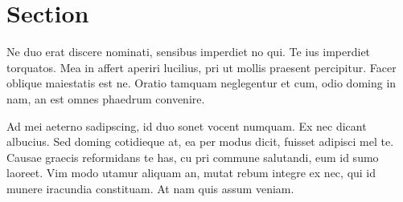 \documentclass[10pt,a4paper,twocolumn,german]{article}
\begin{document}
\section{Section}

	Ne duo erat discere nominati, sensibus imperdiet no qui.
	Te ius imperdiet torquatos.
	Mea in affert aperiri lucilius, pri ut mollis praesent percipitur.
	Facer oblique maiestatis est ne.
	Oratio tamquam neglegentur et cum, odio doming in nam, an est omnes phaedrum convenire.

	Ad mei aeterno sadipscing, id duo sonet vocent numquam.
	Ex nec dicant albucius. Sed doming cotidieque at, ea per modus dicit, fuisset adipisci mel te.
	Causae graecis reformidans te has, cu pri commune salutandi, eum id sumo laoreet.
	Vim modo utamur aliquam an, mutat rebum integre ex nec, qui id munere iracundia constituam.
	At nam quis assum veniam.	
\end{document}
